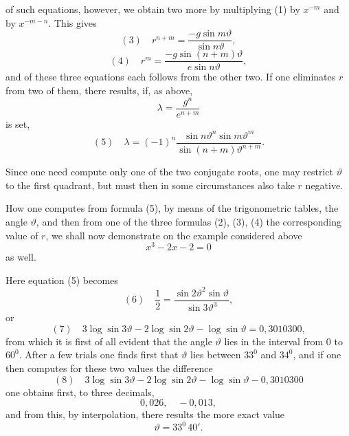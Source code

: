 of such equations, however, we obtain two more by multiplying (1) by $x^{-m}$ and by $x^{-m-n}$. This gives
\[
(3)\quad r^{n+m} = \frac{-g\sin m\vartheta}{\sin n\vartheta},
\]
\[
(4)\quad r^m = \frac{-g\sin(n+m)\vartheta}{e\sin n\vartheta},
\]
and of these three equations each follows from the other two. If one eliminates $r$ from two of them, there results, if, as above,
\[
\lambda = \frac{g^n}{e^{n+m}}
\]
is set,
\[
(5)\quad \lambda = (-1)^n \frac{\sin n\vartheta^n \sin m\vartheta^m}{\sin(n+m)\vartheta^{n+m}}.
\]

Since one need compute only one of the two conjugate roots, one may restrict $\vartheta$ to the first quadrant, but must then in some circumstances also take $r$ negative.

How one computes from formula (5), by means of the trigonometric tables, the angle $\vartheta$, and then from one of the three formulas (2), (3), (4) the corresponding value of $r$, we shall now demonstrate on the example considered above
\[
x^3 - 2x - 2 = 0
\]
as well.

Here equation (5) becomes
\[
(6)\quad \frac{1}{2} = \frac{\sin 2\vartheta^2 \sin\vartheta}{\sin 3\vartheta^3},
\]
or
\[
(7)\quad 3\log\sin 3\vartheta - 2\log\sin 2\vartheta - \log\sin\vartheta = 0{,}3010300,
\]
from which it is first of all evident that the angle $\vartheta$ lies in the interval from 0 to $60^0$. After a few trials one finds first that $\vartheta$ lies between $33^0$ and $34^0$, and if one then computes for these two values the difference
\[
(8)\quad 3\log\sin 3\vartheta - 2\log\sin 2\vartheta - \log\sin\vartheta - 0{,}3010300
\]
one obtains first, to three decimals,
\[
0{,}026, \quad -0{,}013,
\]
and from this, by interpolation, there results the more exact value
\[
\vartheta = 33^0\,40'.
\]

